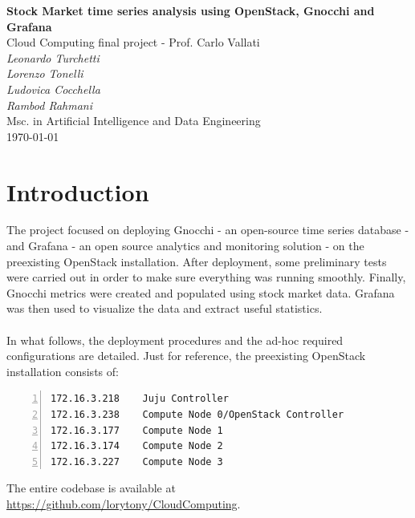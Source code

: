 \documentclass[11pt,a4paper]{article}
\begin{document}
\begin{center}
    \Large\textbf{Stock Market time series analysis using OpenStack, Gnocchi and Grafana}\\
    \vspace{0.2cm}
    \large{Cloud Computing final project - Prof. Carlo Vallati}\\
    \vspace{1.0cm}
    \large\textit{Leonardo Turchetti}\\
    \large\textit{Lorenzo Tonelli}\\
    \large\textit{Ludovica Cocchella}\\
    \large\textit{Rambod Rahmani}\\
    \vspace{0.2cm}
    \normalsize{Msc. in Artificial Intelligence and Data Engineering}\\
    \vspace{1.0cm}
    \today
\end{center}
\vspace{1cm}
\tableofcontents
\vspace{1cm}
\section{Introduction}
The project focused on deploying Gnocchi - an open-source time series database - and Grafana - an open source analytics and monitoring solution - on the preexisting OpenStack installation. After deployment, some preliminary tests were carried out in order to make sure everything was running smoothly. Finally, Gnocchi metrics were created and populated using stock market data. Grafana was then used to visualize the data and extract useful statistics.\\
\\
In what follows, the deployment procedures and the ad-hoc required configurations are detailed. Just for reference, the preexisting OpenStack installation consists of:
\begin{lstlisting}[numbers=left]
172.16.3.218    Juju Controller
172.16.3.238    Compute Node 0/OpenStack Controller
172.16.3.177    Compute Node 1
172.16.3.174    Compute Node 2
172.16.3.227    Compute Node 3
\end{lstlisting}
The entire codebase is available at \url{https://github.com/lorytony/CloudComputing}.
\end{document}
